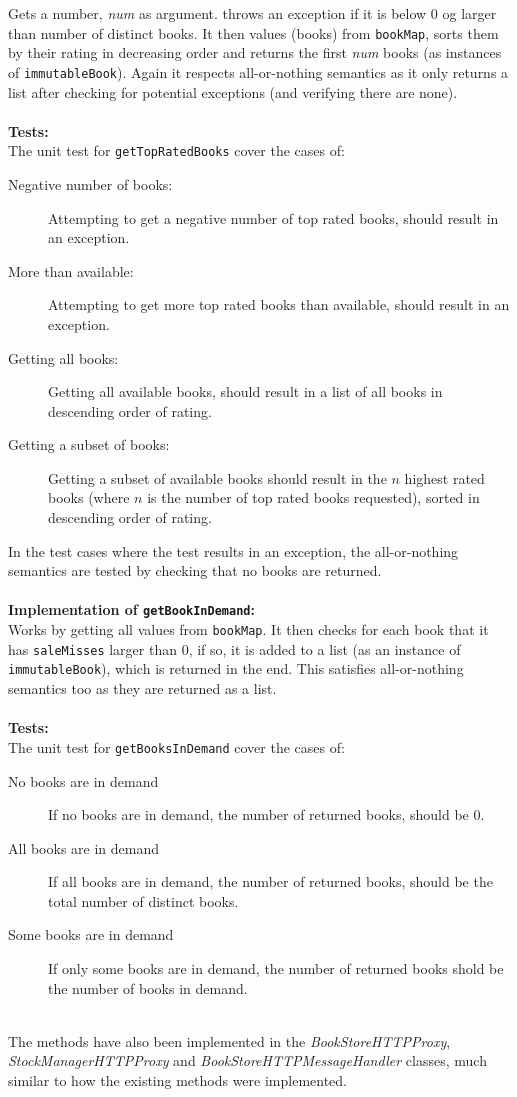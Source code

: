\documentclass[a4paper]{article}
\begin{document}
Gets a number, \textit{num} as argument. throws an exception if it is below $0$ og larger than number of distinct books. It then values (books) from \texttt{bookMap}, sorts them by their rating in decreasing order and returns the first \textit{num} books (as instances of \texttt{immutableBook}). Again it respects all-or-nothing semantics as it only returns a list after checking for potential exceptions (and verifying there are none). \\
\\
\textbf{Tests:}\\
The unit test for \texttt{getTopRatedBooks} cover the cases of:
\begin{description}
  \item[Negative number of books:] Attempting to get a negative number of top rated books, should result in an exception.
  \item[More than available:] Attempting to get more top rated books than available, should result in an exception.
  \item[Getting all books:] Getting all available books, should result in a list of all books in descending order of rating.
  \item[Getting a subset of books:] Getting a subset of available books should result in the $n$ highest rated books (where $n$ is the number of top rated books requested), sorted in descending order of rating.
\end{description}
In the test cases where the test results in an exception, the all-or-nothing semantics are tested by checking that no books are returned.\\
\\
\textbf{Implementation of \texttt{getBookInDemand}:}\\
Works by getting all values from \texttt{bookMap}. It then checks for each book that it has \texttt{saleMisses} larger than $0$, if so, it is added to a list (as an instance of \texttt{immutableBook}), which is returned in the end. This satisfies all-or-nothing semantics too as they are returned as a list. \\
\\
\textbf{Tests:}\\
The unit test for \texttt{getBooksInDemand} cover the cases of:
\begin{description}
  \item[No books are in demand] If no books are in demand, the number of returned books, should be $0$.
  \item[All books are in demand] If all books are in demand, the number of returned books, should be the total number of distinct books.
  \item[Some books are in demand] If only some books are in demand, the number of returned books shold be the number of books in demand.
\end{description}
\hfill \\
The methods have also been implemented in the \textit{BookStoreHTTPProxy}, \textit{StockManagerHTTPProxy} and \textit{BookStoreHTTPMessageHandler} classes, much similar to how the existing methods were implemented.
\end{document}
